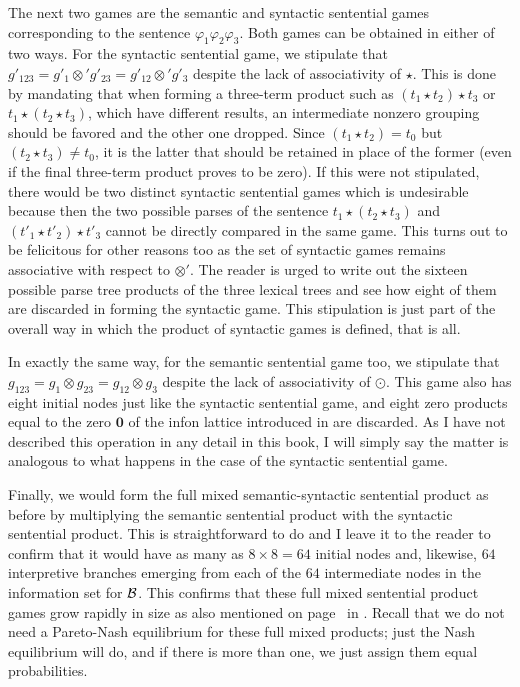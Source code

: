The next two games are the semantic and syntactic sentential games corresponding to the sentence $\varphi_1\varphi_2\varphi_3$. Both games can be obtained in either of two ways. For the syntactic sentential game, we stipulate that $g'_{123} = g'_1 \otimes' g'_{23} = g'_{12} \otimes' g'_3$ despite the lack of associativity of $\star$. This is done by mandating that when forming a three-term product such as $(t_1 \star t_2) \star t_3$ or $t_1 \star (t_2 \star t_3)$, which have different results, an intermediate nonzero grouping should be favored and the other one dropped. Since $(t_1 \star t_2) = t_0$ but $(t_2 \star t_3) \neq t_0$, it is the latter that should be retained in place of the former (even if the final three-term product proves to be zero). If this were not stipulated, there would be two distinct syntactic sentential games which is undesirable because then the two possible parses of the sentence $t_1 \star (t_2 \star t_3)$ and $(t'_1 \star t'_2) \star t'_3$ cannot be directly compared in the same game. This turns out to be felicitous for other reasons too as the set of syntactic games remains associative with respect to $\otimes'$. The reader is urged to write out the sixteen possible parse tree products of the three lexical trees and see how eight of them are discarded in forming the syntactic game. This stipulation is just part of the overall way in which the product of syntactic games is defined, that is all.

In exactly the same way, for the semantic sentential game too, we stipulate that $g_{123} = g_1 \otimes g_{23} = g_{12} \otimes g_3$ despite the lack of associativity of $\odot$. This game also has eight initial nodes just like the syntactic sentential game, and eight zero products equal to the zero $\mathbf{0}$ of the infon lattice introduced in  are discarded. As I have not described this operation in any detail in this book, I will simply say the matter is analogous to what happens in the case of the syntactic sentential game.

Finally, we would form the full mixed semantic-syntactic sentential product as before by multiplying the semantic sentential product with the syntactic sentential product. This is straightforward to do and I leave it to the reader to confirm that it would have as many as $8 \times 8 = 64$ initial nodes and, likewise, $64$ interpretive branches emerging from each of the $64$ intermediate nodes in the information set for $\cal B$. This confirms that these full mixed sentential product games grow rapidly in size as also mentioned on page~\pageref{page:mixed products} in . Recall that we do not need a Pareto-Nash equilibrium for these full mixed products; just the Nash equilibrium will do, and if there is more than one, we just assign them equal probabilities.

